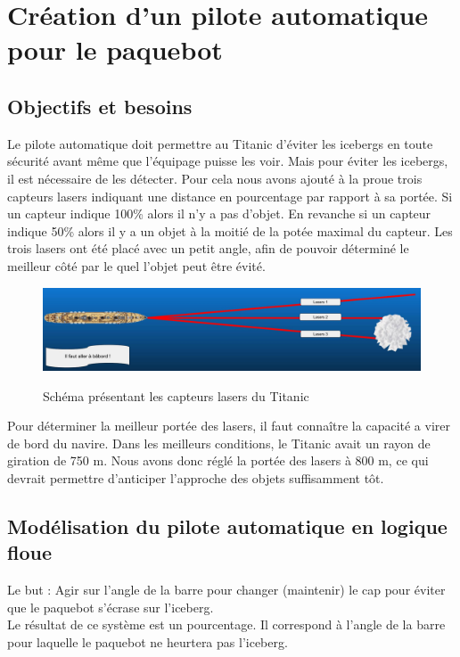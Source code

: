 \documentclass[a4paper,11pt]{article}
\begin{document}
    \section{Création d'un pilote automatique pour le paquebot}

    \subsection{Objectifs et besoins}

    Le pilote automatique doit permettre au Titanic d’éviter les icebergs en toute sécurité avant même que l'équipage puisse les voir.
    Mais pour éviter les icebergs, il est nécessaire de les détecter. Pour cela nous avons ajouté à la proue trois capteurs lasers indiquant une distance en pourcentage par rapport à sa portée.
    Si un capteur indique 100\% alors il n'y a pas d'objet. En revanche si un capteur indique 50\% alors il y a un objet à la moitié de la potée maximal du capteur. Les trois lasers ont été placé avec un petit angle, afin de pouvoir déterminé le meilleur côté par le quel l'objet peut être évité.

    \begin{figure}[H]
        \begin{center}
            \caption{Schéma présentant les capteurs lasers du Titanic}
            \includegraphics[scale=0.26]{assets/Lasers_Illustration.jpg}
            \label{fig:titanicLasers}
        \end{center}
    \end{figure}

    Pour déterminer la meilleur portée des lasers, il faut connaître la capacité a virer de bord du navire. Dans les meilleurs conditions, le Titanic avait un rayon de giration de 750 m. Nous avons donc réglé la portée des lasers à 800 m, ce qui devrait permettre d’anticiper l’approche des objets suffisamment tôt.

    \subsection{Modélisation du pilote automatique en logique floue}

    Le but : Agir sur l’angle de la barre pour changer (maintenir) le cap pour éviter que le paquebot s’écrase sur l’iceberg.\\
    Le résultat de ce système est un pourcentage. Il correspond à l’angle de la barre pour laquelle le paquebot ne heurtera pas l’iceberg.
\end{document}
